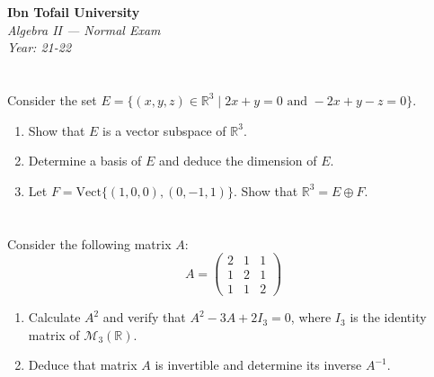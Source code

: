 \documentclass[12pt]{article}
\begin{document}
\begin{center}
  \Large\textbf{Ibn Tofail University} \\[1em]
  \large\textit{Algebra II — Normal Exam} \\[0.5em]
  \large\textit{Year: 21-22} \\[2em]
\end{center}

\vspace{0.5cm}

\section{}
Consider the set $E = \{(x,y,z) \in \mathbb{R}^3 \mid 2x + y = 0 \text{ and } -2x + y - z = 0\}$.

\begin{enumerate}
    \item Show that $E$ is a vector subspace of $\mathbb{R}^3$.
    \item Determine a basis of $E$ and deduce the dimension of $E$.
    \item Let $F = \text{Vect}\{(1,0,0), (0,-1,1)\}$. Show that $\mathbb{R}^3 = E \oplus F$.
\end{enumerate}


\begin{answerbox}
\end{answerbox}

\newpage  
\section{}
Consider the following matrix $A$:
\[
A = \begin{pmatrix}
2 & 1 & 1 \\
1 & 2 & 1 \\
1 & 1 & 2
\end{pmatrix}
\]

\begin{enumerate}
    \item Calculate $A^2$ and verify that $A^2 - 3A + 2I_3 = 0$, where $I_3$ is the identity matrix of $\mathcal{M}_3(\mathbb{R})$.
    \item Deduce that matrix $A$ is invertible and determine its inverse $A^{-1}$.
\end{enumerate}


\begin{answerbox}
\end{answerbox}
\end{document}
